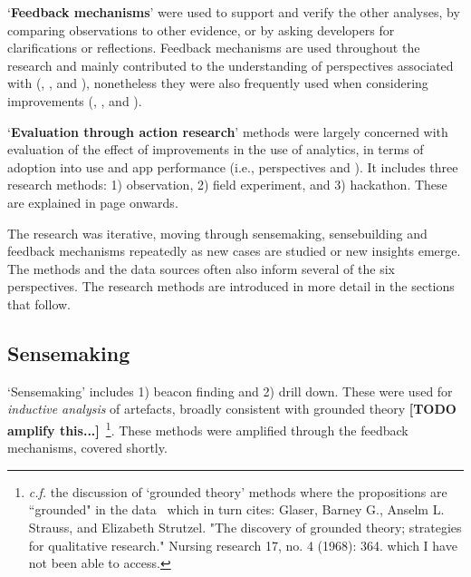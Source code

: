 `\textbf{Feedback mechanisms}' were used to support and verify the other analyses, by comparing observations to other evidence, or by asking developers for clarifications or reflections. Feedback mechanisms are used throughout the research and mainly contributed to the understanding of perspectives associated with (\uuse, \uartefacts, and \utools), nonetheless they were also frequently used when considering improvements (\iuse, \iartefacts, and \itools). 

`\textbf{Evaluation through action research}' methods were largely concerned with evaluation of the effect of improvements in the use of analytics, in terms of adoption into use and app performance (i.e., perspectives \iuse and \iartefacts). It includes three research methods: 1) observation, 2) field experiment, and 3) hackathon. These are explained in page \pageref{section-evaluation-through-action-research-method} onwards. 

The research was iterative, moving through sensemaking, sensebuilding and feedback mechanisms repeatedly as new cases are studied or new insights emerge.  The methods and the data sources often also inform several of the six perspectives.  The research methods are introduced in more detail in the sections that follow.

\subsection{Sensemaking}

`Sensemaking' includes 1) beacon finding and 2) drill down. These were used for \textit{inductive analysis} of artefacts, broadly consistent with grounded theory \textbf{[TODO amplify this...]}~\footnote{\textit{c.f.} the discussion of `grounded theory' methods where the propositions are ``grounded" in the data~\citep[p.566]{seaman1999_qualitative_methods_in_esse} which in turn cites: {\tiny Glaser, Barney G., Anselm L. Strauss, and Elizabeth Strutzel. "The discovery of grounded theory; strategies for qualitative research." Nursing research 17, no. 4 (1968): 364.} which I have not been able to access.}. 
%
These methods were amplified through the feedback mechanisms, covered shortly. 

